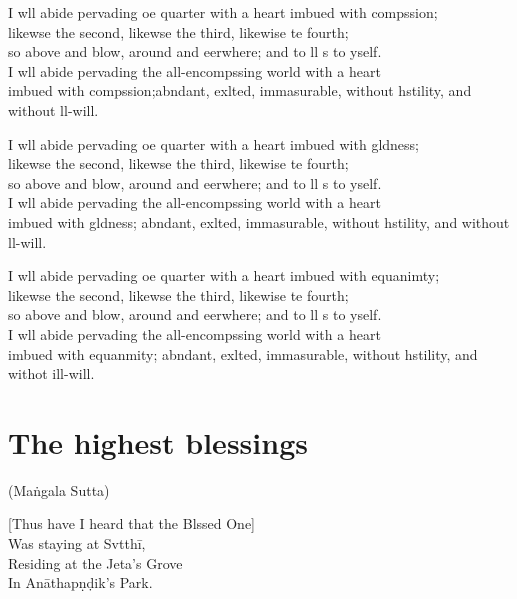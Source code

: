 I wll abide pervading oe quarter with a heart imbued with compssion;\\
likewse the second, likewse the third, likewise te fourth;\\
so above and blow, around and eerwhere; and to ll s to yself.\\
I wll abide pervading the all-encompssing world with a heart \\
imbued with compssion;abndant, exlted, immasurable, without hstility, and without ll-will.

I wll abide pervading oe quarter with a heart imbued with gldness;\\
likewse the second, likewse the third, likewise te fourth;\\
so above and blow, around and eerwhere; and to ll s to yself.\\
I wll abide pervading the all-encompssing world with a heart \\
imbued with gldness; abndant, exlted, immasurable, without hstility, and without ll-will.

I wll abide pervading oe quarter with a heart imbued with equanimty;\\
likewse the second, likewse the third, likewise te fourth;\\
so above and blow, around and eerwhere; and to ll s to yself.\\
I wll abide pervading the all-encompssing world with a heart \\
imbued with equanmity; abndant, exlted, immasurable, without hstility, and withot ill-will.


\chapter{The highest blessings}

(Maṅgala Sutta)

\begin{leader}
\end{leader}

[Thus have I heard that the Blssed One]\\
Was staying at Svtthī,\\
Residing at the Jeta's Grove\\
In Anāthapṇḍik's Park.

